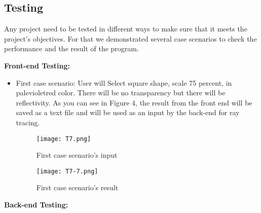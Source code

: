 \documentclass{article}
\begin{document}
 \newpage
\subsection{Testing}
Any project need to be tested in different ways to make sure that it meets the project’s objectives. For that we demonstrated several case scenarios to check the performance and the result of the program. \newline



\textbf{Front-end Testing:}

\begin{itemize}
    \item First case scenario: \newline
    User will Select square shape, scale 75 percent, in palevioletred color. There will be no transparency but there will be reflectivity. As you can see in Figure 4, the result from the front end will be saved as a text file and will be used as an input by the back-end for ray tracing. 
    
    \begin{figure}[H]
\centering
\texttt{[image: T7.png]}
\caption{First case scenario's input \label{test1}}
\end{figure}

\begin{figure}
    \centering
    \texttt{[image: T7-7.png]}
    \caption{First case scenario's result}
    \label{test1}
\end{figure}

\end{itemize}


\textbf{Back-end Testing: } 

\newline
\end{document}
